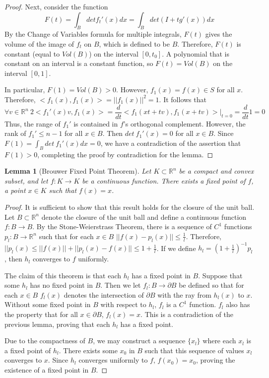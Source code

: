 \documentclass[12pt]{article}
\newtheorem{lemma}[theorem]{Lemma}
\theoremstyle{definition}
\theoremstyle{remark}
\begin{document}
\begin{proof}
Next, consider the function
\[
	F(t) = \int_B det f_t'(x)dx = \int_B det(I + tg'(x))dx
\]
By the Change of Variables formula for multiple integrals, $F(t)$ gives the volume of the image of $f_t$ on $B$, which is defined to be $B$. Therefore, $F(t)$ is constant (equal to $Vol(B)$) on the interval $[0,t_0]$. A polynomial that is constant on an interval is a constant function, so $F(t) = Vol(B)$ on the interval $[0,1]$.

In particular, $F(1) = Vol(B) > 0$. However, $f_1(x) = f(x) \in S$ for all $x$. Therefore, $<f_1(x) , f_1(x)> = ||f_1(x)||^2 = 1$. It follows that
\[
	\forall v \in \mathbb{R}^n\ 2<f_1'(x)v , f_1(x)> = \frac{d}{dt}<f_1(xt + tv) , f_1(x+tv)>|_{t=0} = \frac{d}{dt}1 = 0
\]
Thus, the range of $f_1'$ is contained in $f$'s orthogonal complement. However, the rank of $f_1' \leq n-1$ for all $x \in B$. Then $det\ f_1'(x) = 0$ for all $x \in B$. Since $F(1) = \int_B det\ f_1'(x)dx = 0$, we have a contradiction of the assertion that $F(1) > 0$, completing the proof by contradiction for the lemma.
\end{proof}

\begin{lemma}[Brouwer Fixed Point Theorem]
Let $K \subset \mathbb{R}^n$ be a compact and convex subset, and let $f:K \rightarrow K$ be a continuous function. There exists a fixed point of $f$, a point $x \in K$ such that $f(x) = x$.
\end{lemma}

\begin{proof}
It is sufficient to show that this result holds for the closure of the unit ball. Let $B \subset \mathbb{R}^n$ denote the closure of the unit ball and define a continuous function $f:B \rightarrow B$. By the Stone-Weierstrass Theorem, there is a sequence of $C^1$ functions $p_l: B \rightarrow \mathbb{R}^n$ such that for each
$x \in B$ $||f(x) - p_l(x)|| \leq \frac{1}{l}$. Therefore, $||p_l(x) \leq ||f(x)|| + ||p_l(x) - f(x)|| \leq 1 + \frac{1}{l}$. If we define $h_l = (1 + \frac{1}{l})^{-1}p_l$, then $h_l$ converges to $f$ uniformly.

The claim of this theorem is that each $h_l$ has a fixed point in $B$. Suppose that some $h_l$ has no fixed point in $B$. Then we let $f_l: B \rightarrow \partial B$ be defined so that for each $x \in B$ $f_l(x)$ denotes the intersection of $\partial B$ with the ray from $h_l(x)$ to $x$. Without some fixed point in $B$ with
respect to $h_l$, $f_l$ is a $C^1$ function. $f_l$ also has the property that for all $x \in \partial B$, $f_l(x) = x$. This is a contradiction of the previous lemma, proving that each $h_l$ has a fixed point.

Due to the compactness of $B$, we may construct a sequence $\{x_l\}$ where each $x_l$ is a fixed point of $h_l$. There exists some $x_0$ in $B$ such that this sequence of values $x_l$ converges to $x$. Since $h_l$ converges uniformly to $f$, $f(x_0) = x_0$, proving the existence of a fixed point in $B$.
\end{proof}
\end{document}
